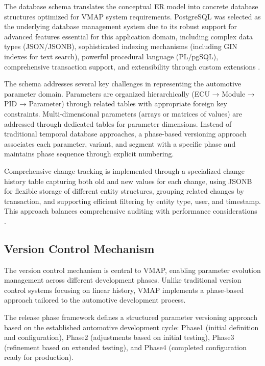 The database schema translates the conceptual ER model into concrete database structures optimized for VMAP system requirements. PostgreSQL was selected as the underlying database management system due to its robust support for advanced features essential for this application domain, including complex data types (JSON/JSONB), sophisticated indexing mechanisms (including GIN indexes for text search), powerful procedural language (PL/pgSQL), comprehensive transaction support, and extensibility through custom extensions \cite{biriukov2018implementation}.

The schema addresses several key challenges in representing the automotive parameter domain. Parameters are organized hierarchically (ECU → Module → PID → Parameter) through related tables with appropriate foreign key constraints. Multi-dimensional parameters (arrays or matrices of values) are addressed through dedicated tables for parameter dimensions. Instead of traditional temporal database approaches, a phase-based versioning approach associates each parameter, variant, and segment with a specific phase and maintains phase sequence through explicit numbering.

Comprehensive change tracking is implemented through a specialized change history table capturing both old and new values for each change, using JSONB for flexible storage of different entity structures, grouping related changes by transaction, and supporting efficient filtering by entity type, user, and timestamp. This approach balances comprehensive auditing with performance considerations \cite{bhattacherjee2015principles}.

\subsection{Version Control Mechanism}
\label{subsec:version-control-mechanism}

The version control mechanism is central to VMAP, enabling parameter evolution management across different development phases. Unlike traditional version control systems focusing on linear history, VMAP implements a phase-based approach tailored to the automotive development process.

The release phase framework defines a structured parameter versioning approach based on the established automotive development cycle: Phase1 (initial definition and configuration), Phase2 (adjustments based on initial testing), Phase3 (refinement based on extended testing), and Phase4 (completed configuration ready for production).

